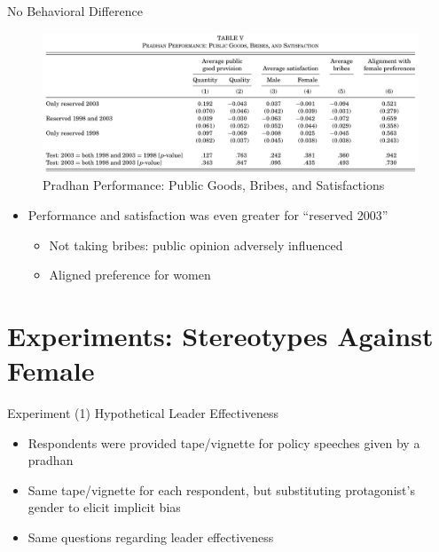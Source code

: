 \documentclass[
  10pt,
  ignorenonframetext,
  aspectratio=43,
]{beamer}
\providecommand{\tightlist}{%
  \setlength{\itemsep}{0pt}\setlength{\parskip}{0pt}}
\begin{document}
\begin{frame}{No Behavioral Difference}
\protect\hypertarget{no-behavioral-difference}{}
\begin{figure}
\centering
\includegraphics{20220523-qje-beaman-duflo-powerful-women.assets/table5-public goods performance.png}
\caption{Pradhan Performance: Public Goods, Bribes, and Satisfactions}
\end{figure}

\begin{itemize}
\tightlist
\item
  Performance and satisfaction was even greater for ``reserved 2003''

  \begin{itemize}
  \tightlist
  \item
    Not taking bribes: public opinion adversely influenced
  \item
    Aligned preference for women
  \end{itemize}
\end{itemize}
\end{frame}

\hypertarget{experiments-stereotypes-against-female}{%
\section{Experiments: Stereotypes Against
Female}\label{experiments-stereotypes-against-female}}

\begin{frame}{Experiment (1) Hypothetical Leader Effectiveness}
\protect\hypertarget{experiment-1-hypothetical-leader-effectiveness}{}
\begin{itemize}
\tightlist
\item
  Respondents were provided tape/vignette for policy speeches given by a
  pradhan
\item
  Same tape/vignette for each respondent, but substituting protagonist's
  gender to elicit implicit bias
\item
  Same questions regarding leader effectiveness
\end{itemize}
\end{frame}
\end{document}
